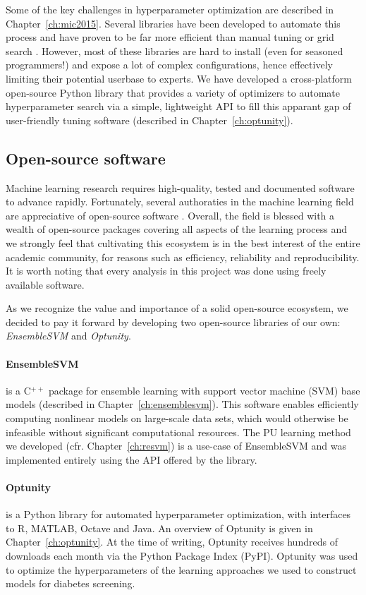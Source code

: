 Some of the key challenges in hyperparameter optimization are described in Chapter~\ref{ch:mic2015}. Several libraries have been developed to automate this process and have proven to be far more efficient than manual tuning or grid search \citep{hutter2009paramils, bergstra2012random, snoek2012practical, bergstra2013hyperopt}. However, most of these libraries are hard to install (even for seasoned programmers!) and expose a lot of complex configurations, hence effectively limiting their potential userbase to experts. We have developed a cross-platform open-source Python library that provides a variety of optimizers to automate hyperparameter search via a simple, lightweight API to fill this apparant gap of user-friendly tuning software (described in Chapter~\ref{ch:optunity}).


\subsection{Open-source software} \label{intro:software}
Machine learning research requires high-quality, tested and documented software to advance rapidly. Fortunately, several authoraties in the machine learning field are appreciative of open-source software \citep{sonnenburg2007need}. Overall, the field is blessed with a wealth of open-source packages covering all aspects of the learning process and we strongly feel that cultivating this ecosystem is in the best interest of the entire academic community, for reasons such as efficiency, reliability and reproducibility. It is worth noting that every analysis in this project was done using freely available software.

As we recognize the value and importance of a solid open-source ecosystem, we decided to pay it forward by developing two open-source libraries of our own: \emph{EnsembleSVM} and \emph{Optunity}.

\paragraph{EnsembleSVM} is a C$^{++}$ package for ensemble learning with support vector machine (SVM) base models (described in Chapter~\ref{ch:ensemblesvm}). This software enables efficiently computing nonlinear models on large-scale data sets, which would otherwise be infeasible without significant computational resources. The PU learning method we developed (cfr. Chapter~\ref{ch:resvm}) is a use-case of EnsembleSVM and was implemented entirely using the API offered by the library.

\paragraph{Optunity} is a Python library for automated hyperparameter optimization, with interfaces to R, MATLAB, Octave and Java. An overview of Optunity is given in Chapter~\ref{ch:optunity}. At the time of writing, Optunity receives hundreds of downloads each month via the Python Package Index (PyPI). Optunity was used to optimize the hyperparameters of the learning approaches we used to construct models for diabetes screening.
